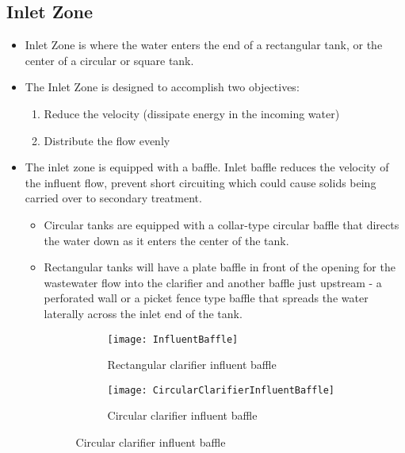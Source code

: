 \subsection{Inlet Zone}		
				\begin{itemize}
					\item Inlet Zone is where the water enters the end 					of a rectangular tank, or the center of a circular 					or square tank.
					\item The Inlet Zone is designed to accomplish two 					objectives:
						\begin{enumerate}
							\item Reduce the velocity (dissipate 									energy in the incoming water)
							\item Distribute the flow evenly
						\end{enumerate}
					\item The inlet zone is equipped with a baffle.  					Inlet baffle reduces the velocity of the 							influent flow, prevent short circuiting which 							could cause solids being carried over to secondary 					treatment.  
						\begin{itemize}
							\item Circular tanks are equipped with a 								collar-type circular baffle that directs 								the water down as it enters the center of 								the tank.
							\item Rectangular tanks will have a plate 								baffle in front of the opening for the 									wastewater flow into the clarifier and 									another baffle just upstream - a 										perforated wall or a picket fence type 									baffle that spreads the water laterally 								across the inlet end of the tank.\\


\begin{figure}[h!]
  \centering
  \begin{subfigure}[b]{0.4\linewidth}
    \texttt{[image: InfluentBaffle]}
    \caption{Rectangular clarifier influent baffle}
  \end{subfigure}
  \hspace{1cm}
  \begin{subfigure}[b]{0.4\linewidth}
    \texttt{[image: CircularClarifierInfluentBaffle]}
    \caption{Circular clarifier influent baffle}
  \end{subfigure}
\end{figure}	
	
%							
						\end{itemize}
				\end{itemize}


